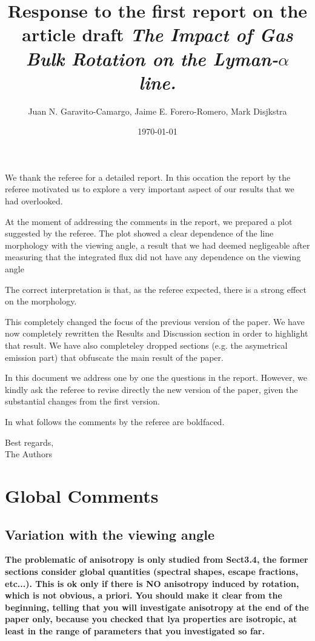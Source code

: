\documentclass[12pt]{article}
\title{Response to the first report on the article draft \emph{The Impact of Gas Bulk Rotation on the Lyman-$\alpha$ line.}}
\author{Juan N. Garavito-Camargo, Jaime E. Forero-Romero, Mark Disjkstra}
\date{\today}
\begin{document}
\maketitle
We thank the referee for a detailed report. In this occation the
report by the referee motivated us to explore a very important aspect
of our results that we had overlooked. 


At the moment of addressing the comments in the report, we
prepared a plot suggested by the referee. The plot showed a clear
dependence of the line morphology with the viewing angle, a result
that we had deemed negligeable after measuring that the integrated
flux did not have any dependence on the viewing angle 

The correct interpretation is that, as the referee expected, there is
a strong effect on the morphology. 

This completely changed the focus of the previous version of the
paper. We have now completely rewritten the Results and Discussion
section in order to highlight that result. We have also completeley dropped
sections (e.g. the asymetrical emission part) that obfuscate the main
result of the paper. 

In this document we address one by one the questions in the
report. However, we kindly ask the referee to revise directly the new
version of the paper, given the substantial changes from the first
version.

In what follows the comments by the referee are boldfaced.


Best regards, \\

The Authors\\




\section{Global Comments}

\subsection{Variation with the viewing angle}

{\bf The problematic of anisotropy is only studied from Sect3.4, the former
sections consider global quantities (spectral shapes, escape
fractions, etc...). This is ok only if there is NO anisotropy induced
by rotation, which is not obvious, a priori. You should make it clear
from the beginning, telling that you will investigate anisotropy at
the end of the paper only, because you checked that lya properties are
isotropic, at least in the range of parameters that you investigated
so far.}
\end{document}
